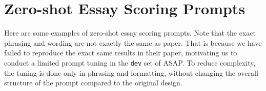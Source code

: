 
\section{Zero-shot Essay Scoring Prompts}
\label{app-scoring-prompts}
Here are some examples of zero-shot essay scoring prompts. Note that the exact phrasing and wording are not exactly the same as \cite{stahl-etal-2024-exploring} paper. That is because we have failed to reproduce the exact same results in their paper, motivating us to conduct a limited prompt tuning in the \texttt{dev} set of ASAP. To reduce complexity, the tuning is done only in phrasing and formatting, without changing the overall structure of the prompt compared to the original design.

